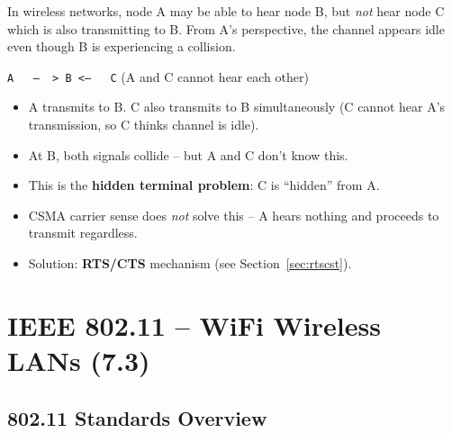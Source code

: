 \begin{warnbox}
In wireless networks, node A may be able to hear node B, but \emph{not} hear node C which is also transmitting to B. From A's perspective, the channel appears idle even though B is experiencing a collision.

\begin{center}
\texttt{A ~~---~~> B <---~~ C} \quad (A and C cannot hear each other)
\end{center}

\begin{itemize}[noitemsep]
    \item A transmits to B. C also transmits to B simultaneously (C cannot hear A's transmission, so C thinks channel is idle).
    \item At B, both signals collide -- but A and C don't know this.
    \item This is the \textbf{hidden terminal problem}: C is ``hidden'' from A.
    \item CSMA carrier sense does \emph{not} solve this -- A hears nothing and proceeds to transmit regardless.
    \item Solution: \textbf{RTS/CTS} mechanism (see Section~\ref{sec:rtscst}).
\end{itemize}
\end{warnbox}

\begin{imagebox}
\end{imagebox}

\section{IEEE 802.11 -- WiFi Wireless LANs (7.3)}

\subsection{802.11 Standards Overview}

